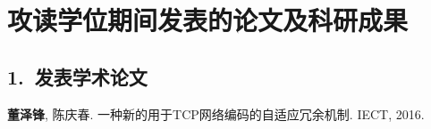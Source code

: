 \chapter*{攻读\cDegree{}学位期间发表的论文及科研成果}

\section*{1.~发表学术论文}
\begin{publist}
	\item \textbf{董泽锋}, 陈庆春. 一种新的用于TCP网络编码的自适应冗余机制. IECT, 2016.
\end{publist}

%
